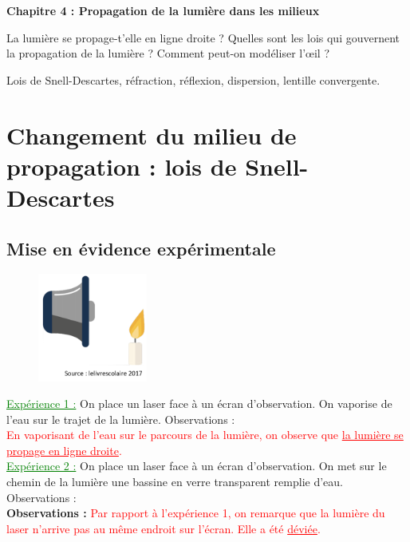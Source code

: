 \modeCorrection

\renewcommand{\thesubsection}{\textcolor{red}{\Roman{section}.\arabic{subsection}}}
\renewcommand{\thesubsubsection}{\textcolor{red}{\Roman{section}.\arabic{subsection}.\alph{subsubsection}}}

\setcounter{section}{0}
\sndEnTeteCoursQuatre

\begin{mdframed}[style=titr, leftmargin=60pt, rightmargin=60pt, innertopmargin=7pt, innerbottommargin=7pt, innerrightmargin=8pt, innerleftmargin=8pt]

\begin{center}
\large{\textbf{Chapitre 4 : Propagation de la lumière dans les milieux}}
\end{center}
\end{mdframed}
La lumière se propage-t'elle en ligne droite ? Quelles sont les lois qui gouvernent la propagation de la lumière ? Comment peut-on modéliser l'\oe il ?

\begin{tcolorbox}[colback=blue!5!white,colframe=blue!75!black,title=Mots clés du chapitre :]
Lois de Snell-Descartes, réfraction, réflexion, dispersion, lentille convergente.
\end{tcolorbox}


\section{Changement du milieu de propagation : lois de Snell-Descartes}
\subsection{Mise en évidence expérimentale}
\begin{figure}
\vspace{-0cm}
    \centering
     \includegraphics[width=0.32\textwidth]{Images/Cours/Chapitre_3/Haut_parleur_bougie.PNG}
   \end{figure}
\textcolor{green}{\underline{Expérience 1 :}} On place un laser face à un écran d'observation. On vaporise de l'eau sur le trajet de la lumière. Observations : \\
\textcolor{red}{En vaporisant de l'eau sur le parcours de la lumière, on observe que \underline{la lumière se propage en ligne droite}.}\\
\textcolor{green}{\underline{Expérience 2 :}} On place un laser face à un écran d'observation. On met sur le chemin de la lumière une bassine en verre transparent remplie d'eau. Observations : \\
\textbf{Observations :} \textcolor{red}{Par rapport à l'expérience 1, on remarque que la lumière du laser n'arrive pas au même endroit sur l'écran. Elle a été \underline{déviée}.}


